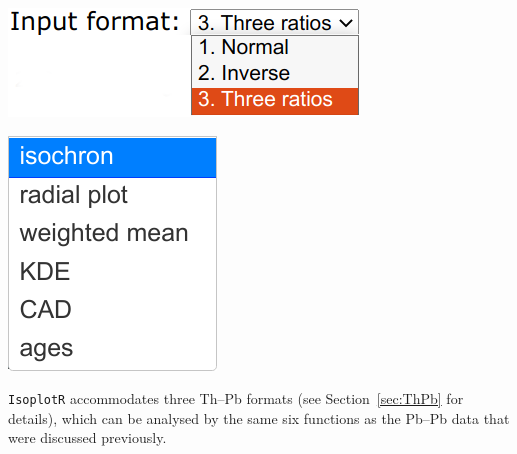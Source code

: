 \begin{refsection}
\noindent\begin{minipage}[t]{.3\linewidth}
\strut\vspace*{-\baselineskip}\newline
\includegraphics[width=\linewidth]{../figures/PbPbFormats.png}
\end{minipage}
\noindent\begin{minipage}[t]{.15\linewidth}
\strut\vspace*{-\baselineskip}\newline
\includegraphics[width=\linewidth]{../figures/PbPbPlotdevices.png}\\
\end{minipage}
\begin{minipage}[t]{.55\textwidth}
  \texttt{IsoplotR} accommodates three Th--Pb formats (see
  Section~\ref{sec:ThPb} for details), which can be analysed by the
  same six functions as the Pb--Pb data that were discussed
  previously.
\end{minipage}


\end{refsection}
